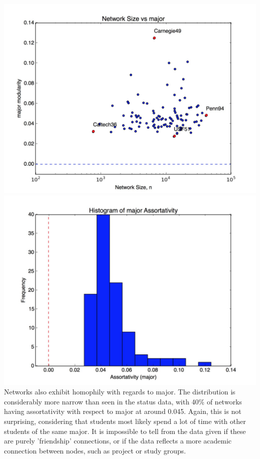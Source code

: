 \documentclass[11pt, oneside]{article}   	%
\begin{document}
\includegraphics[scale=.15]{major.jpg}\includegraphics[scale=.15]{majorHist.jpg}\\
\indent Networks also exhibit homophily with regards to major.  The distribution is considerably more narrow than seen in the status data, with 40\% of networks having assortativity with respect to major at around 0.045.  Again, this is not surprising, considering that students most likely spend a lot of time with other students of the same major.  It is impossible to tell from the data given if these are purely 'friendship' connections, or if the data reflects a more academic connection between nodes, such as project or study groups.\\\\
\end{document}
